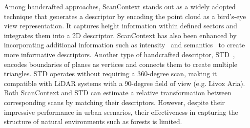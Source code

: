 Among handcrafted approaches, ScanContext\cite{kim2018iros,kim2021tro} stands out as a widely adopted technique that generates a descriptor by encoding the point cloud as a bird’s-eye view representation. It captures height information within defined sectors and integrates them into a 2D descriptor. 
ScanContext has also been enhanced by incorporating additional information such as intensity~\cite{wang2020icra} and semantics~\cite{li2021iros} to create more informative descriptors. 
Another type of handcrafted descriptor, STD~\cite{yuan2023icra}, encodes boundaries of planes as vertices and connects them to create multiple triangles. STD operates without requiring a 360-degree scan, making it compatible with LiDAR systems with a 90-degree field of view (e.g. Livox Aria). Both ScanContext and STD can estimate a relative transformation between corresponding scans by matching their descriptors. However, despite their impressive performance in urban scenarios, their effectiveness in capturing the structure of natural environments such as forests is limited.


